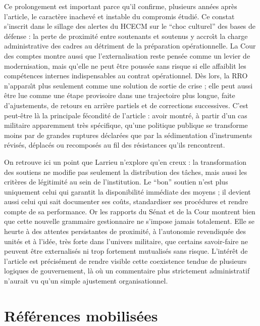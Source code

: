\documentclass[12pt,a4paper]{article}
\begin{document}
Ce prolongement est important parce qu'il confirme, plusieurs ann\'ees apr\`es l'article, le caract\`ere inachev\'e et instable du compromis \'etudi\'e. Ce constat s'inscrit dans le sillage des alertes du HCECM sur le ``choc culturel'' des bases de d\'efense : la perte de proximit\'e entre soutenants et soutenus y accro\^\i t la charge administrative des cadres au d\'etriment de la pr\'eparation op\'erationnelle. La Cour des comptes montre aussi que l'externalisation reste pens\'ee comme un levier de modernisation, mais qu'elle ne peut \^etre pouss\'ee sans risque si elle affaiblit les comp\'etences internes indispensables au contrat op\'erationnel. D\`es lors, la RRO n'appara\^\i t plus seulement comme une solution de sortie de crise ; elle peut aussi \^etre lue comme une \'etape provisoire dans une trajectoire plus longue, faite d'ajustements, de retours en arri\`ere partiels et de corrections successives. C'est peut-\^etre l\`a la principale f\'econdit\'e de l'article : avoir montr\'e, \`a partir d'un cas militaire apparemment tr\`es sp\'ecifique, qu'une politique publique se transforme moins par de grandes ruptures d\'eclar\'ees que par la s\'edimentation d'instruments r\'evis\'es, d\'eplac\'es ou recompos\'es au fil des r\'esistances qu'ils rencontrent.

On retrouve ici un point que Larrieu n'explore qu'en creux : la transformation des soutiens ne modifie pas seulement la distribution des t\^aches, mais aussi les crit\`eres de l\'egitimit\'e au sein de l'institution. Le ``bon'' soutien n'est plus uniquement celui qui garantit la disponibilit\'e imm\'ediate des moyens ; il devient aussi celui qui sait documenter ses co\^uts, standardiser ses proc\'edures et rendre compte de sa performance. Or les rapports du S\'enat et de la Cour montrent bien que cette nouvelle grammaire gestionnaire ne s'impose jamais totalement. Elle se heurte \`a des attentes persistantes de proximit\'e, \`a l'autonomie revendiqu\'ee des unit\'es et \`a l'id\'ee, tr\`es forte dans l'univers militaire, que certains savoir-faire ne peuvent \^etre externalis\'es ni trop fortement mutualis\'es sans risque. L'int\'er\^et de l'article est pr\'ecis\'ement de rendre visible cette coexistence tendue de plusieurs logiques de gouvernement, l\`a o\`u un commentaire plus strictement administratif n'aurait vu qu'un simple ajustement organisationnel.

\section*{R\'ef\'erences mobilis\'ees}
\small
\nocite{Larrieu2018NPMSoutiensArmees}
\nocite{Larrieu2024DefenseNPM}
\nocite{LascoumesLeGales2004GouvernerParLesInstruments}
\nocite{Bezes2009ReinventerEtat}
\nocite{Jakubowski2011InstitutionMilitaire}
\nocite{RogerDulait2012BasesDefense}
\nocite{HCECM2014AdministrationMilitaires}
\nocite{CourDesComptes2023SCA}
\printbibliography[heading=none]
\end{document}
